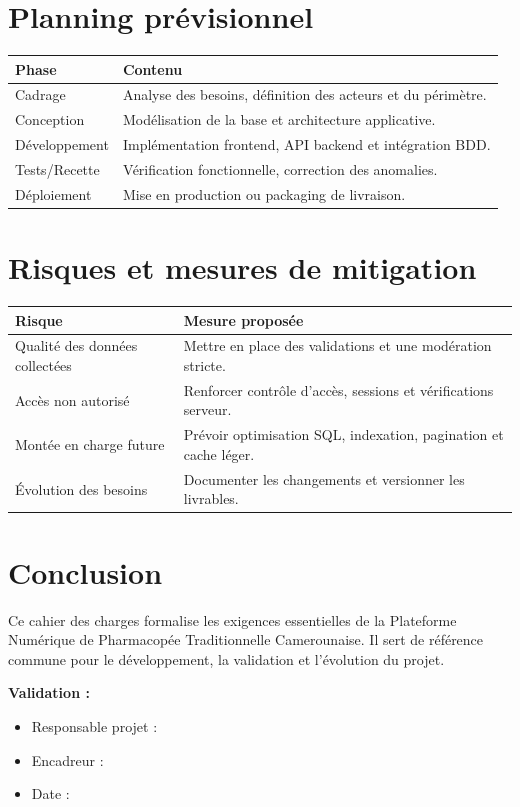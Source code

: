 \documentclass[12pt,a4paper]{article}
\begin{document}
\section{Planning prévisionnel}
\begin{longtable}{p{2.8cm}p{11.7cm}}
\toprule
\textbf{Phase} & \textbf{Contenu} \\
\midrule
Cadrage & Analyse des besoins, définition des acteurs et du périmètre. \\
Conception & Modélisation de la base et architecture applicative. \\
Développement & Implémentation frontend, API backend et intégration BDD. \\
Tests/Recette & Vérification fonctionnelle, correction des anomalies. \\
Déploiement & Mise en production ou packaging de livraison. \\
\bottomrule
\end{longtable}

\section{Risques et mesures de mitigation}
\begin{longtable}{p{5cm}p{9.5cm}}
\toprule
\textbf{Risque} & \textbf{Mesure proposée} \\
\midrule
Qualité des données collectées & Mettre en place des validations et une modération stricte. \\
Accès non autorisé & Renforcer contrôle d'accès, sessions et vérifications serveur. \\
Montée en charge future & Prévoir optimisation SQL, indexation, pagination et cache léger. \\
Évolution des besoins & Documenter les changements et versionner les livrables. \\
\bottomrule
\end{longtable}

\section{Conclusion}
Ce cahier des charges formalise les exigences essentielles de la Plateforme Numérique de Pharmacopée Traditionnelle Camerounaise. Il sert de référence commune pour le développement, la validation et l'évolution du projet.

\vspace{0.8cm}
\textbf{Validation :}
\begin{itemize}[leftmargin=1.2cm]
  \item Responsable projet : \dotfill
  \item Encadreur : \dotfill
  \item Date : \dotfill
\end{itemize}
\end{document}
